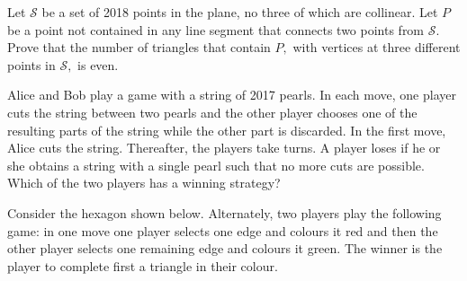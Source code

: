 \documentclass{pset}
\begin{document}
\begin{problems}
\begin{problem}
    Let \(\mathcal{S}\) be a set of 2018 points in the plane, no three of which are collinear. Let \(P\) be a point not contained in any line segment that connects two points from \(\mathcal{S} .\) Prove that the number of triangles that contain \(P,\) with vertices at three different points in \(\mathcal{S},\) is even.
\end{problem}

\begin{problem}
    Alice and Bob play a game with a string of 2017 pearls. In each move, one player cuts the string between two pearls and the other player chooses one of the resulting parts of the string while the other part is discarded. In the first move, Alice cuts the string. Thereafter, the players take turns. A player loses if he or she obtains a string with a single pearl such that no more cuts are possible. Which of the two players has a winning strategy?
\end{problem}

\begin{problem}
    Consider the hexagon shown below. Alternately, two players play the following game: in one move one player
    selects one edge and colours it red and then the other player selects one remaining edge and colours it green. The winner is the player to complete first a triangle in their colour.
    \begin{center}

        \begin{tikzpicture}[x=0.75pt,y=0.75pt,yscale=-0.75,xscale=0.75]


\end{tikzpicture}
\end{center}
\end{problem}
\end{problems}
\end{document}
